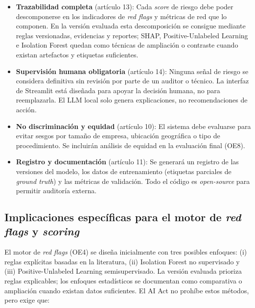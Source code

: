 \documentclass[11pt,a4paper,spanish]{book}
\numberwithin{equation}{chapter}
\numberwithin{figure}{chapter}
\begin{document}
\begin{itemize}
\item \textbf{Trazabilidad completa} (artículo 13): Cada \textit{score} de riesgo debe poder descomponerse en los indicadores de \textit{red flags} y métricas de red que lo componen. En la versi{\'o}n evaluada esta descomposición se consigue mediante reglas versionadas, evidencias y reportes; SHAP, Positive-Unlabeled Learning e Isolation Forest quedan como técnicas de ampliación o contraste cuando existan artefactos y etiquetas suficientes.

\item \textbf{Supervisión humana obligatoria} (artículo 14): Ninguna señal de riesgo se considera definitiva sin revisión por parte de un auditor o técnico. La interfaz de Streamlit está diseñada para apoyar la decisión humana, no para reemplazarla. El LLM local solo genera explicaciones, no recomendaciones de acción.

\item \textbf{No discriminación y equidad} (artículo 10): El sistema debe evaluarse para evitar sesgos por tamaño de empresa, ubicación geográfica o tipo de procedimiento. Se incluirán análisis de equidad en la evaluación final (OE8).

\item \textbf{Registro y documentación} (artículo 11): Se generará un registro de las versiones del modelo, los datos de entrenamiento (etiquetas parciales de \textit{ground truth}) y las métricas de validación. Todo el código es \textit{open-source} para permitir auditoría externa.
\end{itemize}

\subsection{Implicaciones específicas para el motor de \textit{red flags} y \textit{scoring}}

El motor de \textit{red flags} (OE4) se diseña inicialmente con tres posibles enfoques: (i) reglas explícitas basadas en la literatura, (ii) Isolation Forest no supervisado y (iii) Positive-Unlabeled Learning semisupervisado. La versi{\'o}n evaluada prioriza reglas explicables; los enfoques estad{\'i}sticos se documentan como comparativa o ampliación cuando existan datos suficientes. El AI Act no prohíbe estos métodos, pero exige que:
\end{document}
